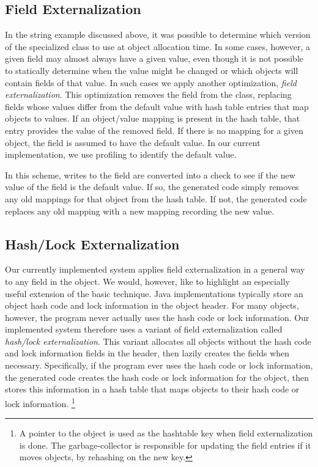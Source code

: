 \documentclass[oribibl]{llncs}
\begin{document}
\subsection{Field Externalization}

In the string example discussed above, it was possible to determine
which version of the specialized class to use at object allocation
time. In some cases, however, a given field may almost always have
a given value, even though it is not possible to statically determine
when the value might be changed or which objects will contain fields of that 
value. In such cases we apply another optimization, 
{\em field externalization}. This optimization removes the field
from the class, replacing fields whose values differ from the default 
value with hash table entries that map objects to values. If an object/value
mapping is present in the hash table, that entry provides the 
value of the removed field. If there is no mapping for a given object,
the field is assumed to have the default value. 
In our current implementation, we use profiling 
to identify the default value. 

In this scheme, writes to the field are converted into a check to see
if the new value of the field is the default value. If so, the 
generated code simply removes any old mappings for that 
object from the hash table.
If not, the generated code replaces any old mapping with a new
mapping recording the new value. 

\subsection{Hash/Lock Externalization}

Our currently implemented system applies field externalization
in a general way to any field in the object. We would, however,
like to highlight an especially useful extension of the basic
technique. Java implementations typically store an object
hash code and lock information in the object header. For many
objects, however, the program never actually uses the hash code
or lock information. Our implemented system therefore uses
a variant of field externalization called {\em hash/lock 
externalization}. This variant allocates all objects 
without the hash code and lock information fields in the header,
then lazily creates the fields when necessary. 
Specifically, if the program ever uses the hash code or lock information, 
the generated code creates the hash code or lock information
for the object, then stores this information in a hash table
that maps objects to their hash code or lock information.%
\footnote{A pointer to the object is used as the hashtable key when
  field externalization is done.  The garbage-collector is responsible
  for updating the field entries if it moves objects, by rehashing on
  the new key.}
\end{document}
